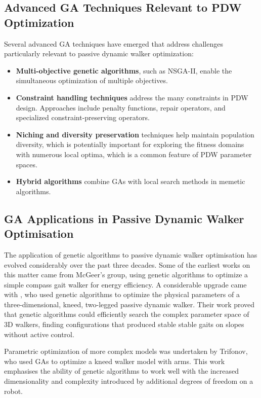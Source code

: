 \subsection{Advanced GA Techniques Relevant to PDW Optimization}
Several advanced GA techniques have emerged that address challenges particularly relevant to passive dynamic walker optimization:

\begin{itemize}
    \item \textbf{Multi-objective genetic algorithms}, such as NSGA-II\cite{Deb2002}, enable the simultaneous optimization of multiple objectives.
    \item \textbf{Constraint handling techniques} address the many constraints in PDW design. Approaches include penalty functions, repair operators, and specialized constraint-preserving operators.
    \item \textbf{Niching and diversity preservation} techniques help maintain population diversity, which is potentially important for exploring the fitness domains with numerous local optima, which is a common feature of PDW parameter spaces.
    \item \textbf{Hybrid algorithms} combine GAs with local search methods in memetic algorithms.
\end{itemize}



\subsection{GA Applications in Passive Dynamic Walker Optimisation}
The application of genetic algorithms to passive dynamic walker optimisation has evolved considerably over the past three decades.
Some of the earliest works on this matter came from McGeer's group,  using genetic algorithms to optimize a simple compass gait walker for energy efficiency.
A considerable upgrade came with \cite{Collins2001}, who used genetic algorithms to optimize the physical parameters of a three-dimensional, kneed, two-legged passive dynamic walker.
Their work proved that genetic algorithms could efficiently search the complex parameter space of 3D walkers, finding configurations that produced stable stable gaits on slopes without active control.

Parametric optimization of more complex models was undertaken by Trifonov\cite{Trifonov2008}, who used GAs to optimize a kneed walker model with arms.
This work emphasises the ability of genetic algorithms to work well with the increased dimensionality and complexity introduced by additional degrees of freedom on a robot.

